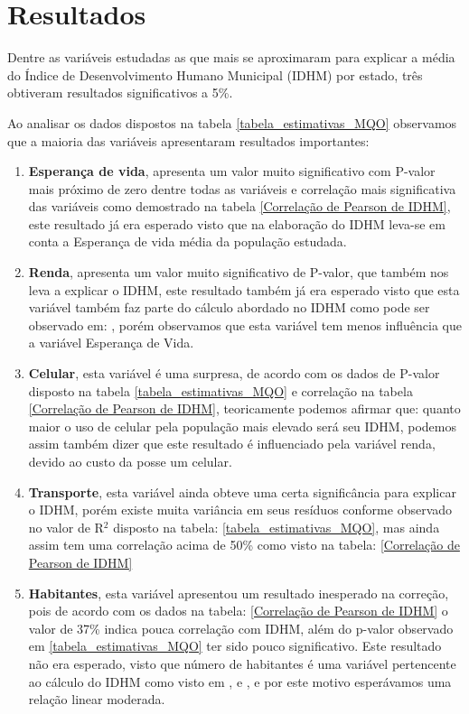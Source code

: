 \documentclass[journal]{IEEEtran}
\begin{document}
\section{Resultados}

Dentre as variáveis estudadas as que mais se aproximaram para explicar a média do Índice de Desenvolvimento Humano Municipal (IDHM) por estado, três obtiveram resultados significativos a 5\%.

Ao analisar os dados dispostos na tabela \ref{tabela_estimativas_MQO} observamos que a maioria das variáveis apresentaram resultados importantes:

\begin{enumerate}
\item {\textbf{Esperança de vida}, apresenta um valor muito significativo com P-valor mais próximo de zero dentre todas as variáveis e correlação mais significativa das variáveis como demostrado na tabela \ref{Correlação de Pearson de IDHM}, este resultado já era esperado visto que na elaboração do IDHM leva-se em conta a Esperança de vida média da população estudada.\cite{Liana2015}}
\item {\textbf{Renda}, apresenta um valor muito significativo de P-valor, que também nos leva a explicar o IDHM, este resultado também já era esperado visto que esta variável também faz parte do cálculo abordado no IDHM como pode ser observado em: \cite{Liana2015}\cite{Luciana2007}, porém observamos que esta variável tem menos influência que a variável Esperança de Vida.}
\item {\textbf{Celular}, esta variável é uma surpresa, de acordo com os dados de P-valor disposto na tabela \ref{tabela_estimativas_MQO} e correlação na tabela  \ref{Correlação de Pearson de IDHM}, teoricamente podemos afirmar que: quanto maior o uso de celular pela população mais elevado será seu IDHM, podemos assim também dizer que este resultado é influenciado pela variável renda, devido ao custo da posse um celular.}
\item {\textbf{Transporte}, esta variável ainda obteve uma certa significância para explicar o IDHM, porém existe muita variância em seus resíduos conforme observado no valor de R$^2$ disposto na tabela: \ref{tabela_estimativas_MQO}, mas ainda assim tem uma correlação acima de 50\% como visto na tabela: \ref{Correlação de Pearson de IDHM}}
\item {\textbf{Habitantes}, esta variável apresentou um resultado inesperado na correção, pois de acordo com os dados na tabela: \ref{Correlação de Pearson de IDHM} o valor de 37\% indica pouca correlação com IDHM, além do p-valor observado em \ref{tabela_estimativas_MQO} ter sido pouco significativo. Este resultado não era esperado, visto que número de habitantes é uma variável pertencente ao cálculo do IDHM como visto em \cite{Liana2015},\cite{Luciana2007} e \cite{Ferreira2015}, e por este motivo esperávamos uma relação linear moderada.}

\end{enumerate}
\end{document}
